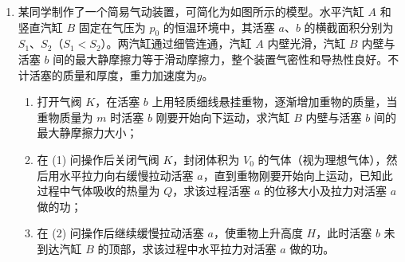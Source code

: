 \documentclass[\gkver]{gaokaozhenti}
\begin{document}
\begin{enumerate}
{\begin{enumerate}
	\item
	$\frac{{9\pi R}}{{10v}}$
\end{enumerate}
}

\item
某同学制作了一个简易气动装置，可简化为如图所示的模型。水平汽缸 $ A $ 和竖直汽缸 $ B $ 固定在气压为 $ p_{0} $ 的恒温环境中，其活塞 $ a $、$ b $ 的横截面积分别为 $ S_{1} $、$ S_{2} $（$S_{1} < S_{2}$）。两汽缸通过细管连通，汽缸 $ A $ 内壁光滑，汽缸 $ B $ 内壁与活塞 $ b $ 间的最大静摩擦力等于滑动摩擦力，整个装置气密性和导热性良好。不计活塞的质量和厚度，重力加速度为$ g $。
\begin{enumerate}
	\item 
打开气阀 $ K $，在活塞 $ b $ 上用轻质细线悬挂重物，逐渐增加重物的质量，当重物质量为 $ m $ 时活塞 $ b $ 刚要开始向下运动，求汽缸 $ B $ 内壁与活塞 $ b $ 间的最大静摩擦力大小；

\item
在 (1) 问操作后关闭气阀 $ K $，封闭体积为 $ V_{0} $ 的气体（视为理想气体），然后用水平拉力向右缓慢拉动活塞 $ a $，直到重物刚要开始向上运动，已知此过程中气体吸收的热量为 $ Q $，求该过程活塞 $ a $ 的位移大小及拉力对活塞 $ a $ 做的功；

\item
在 (2) 问操作后继续缓慢拉动活塞 $ a $，使重物上升高度 $ H $，此时活塞 $ b $ 未到达汽缸 $ B $ 的顶部，求该过程中水平拉力对活塞 $ a $ 做的功。
\end{enumerate}
\onepicture[align=right, w=10.02cm]{}
\end{enumerate}
\end{document}
